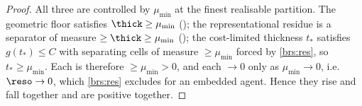 \begin{proof}
All three are controlled by $\mu_{\min}$ at the finest realisable partition. The
geometric floor satisfies $\thick\ge\mu_{\min}$ (); the
representational residue is a separator of measure $\ge\thick\ge\mu_{\min}$
(); the cost-limited thickness $t_\ast$ satisfies
$g(t_\ast)\le C$ with separating cells of measure $\ge\mu_{\min}$ forced by
\ref{brs:res}, so $t_\ast\ge\mu_{\min}$. Each is therefore $\ge\mu_{\min}>0$, and
each $\to0$ only as $\mu_{\min}\to0$, i.e.\ $\reso\to0$, which \ref{brs:res}
excludes for an embedded agent. Hence they rise and fall together and are
positive together.
\end{proof}
